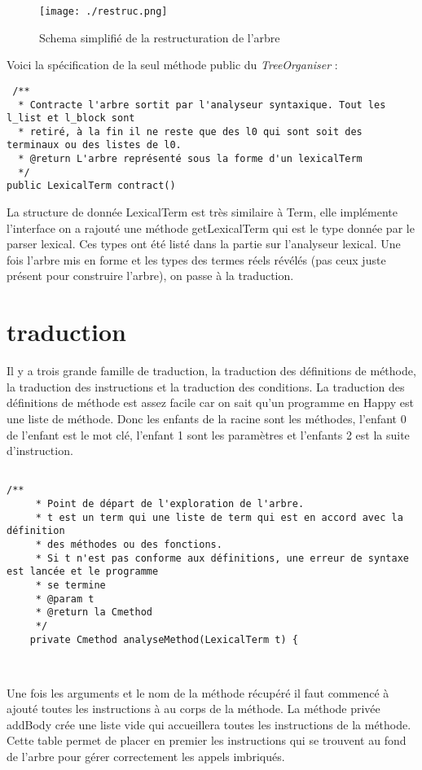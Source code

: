 \begin{figure}
 \centering
 \texttt{[image: ./restruc.png]}
 \caption{Schema simplifié de la restructuration de l'arbre}
 \label{restruc}
\end{figure}


Voici la spécification de la seul méthode public du \textit{TreeOrganiser} :
\begin{verbatim}
 /**
  * Contracte l'arbre sortit par l'analyseur syntaxique. Tout les l_list et l_block sont
  * retiré, à la fin il ne reste que des l0 qui sont soit des terminaux ou des listes de l0.
  * @return L'arbre représenté sous la forme d'un lexicalTerm
  */
public LexicalTerm contract()
\end{verbatim}

La structure de donnée LexicalTerm est très similaire à Term, elle implémente l'interface on a rajouté une méthode getLexicalTerm
qui est le type donnée par le parser lexical. Ces types ont été listé dans la partie sur l'analyseur lexical. Une fois 
l'arbre mis en forme et les types des termes réels révélés (pas ceux juste présent pour construire l'arbre), on passe à la traduction.

\section{traduction}
Il y a trois grande famille de traduction, la traduction des définitions de méthode, la traduction des instructions et la traduction des conditions.
La traduction des définitions de méthode est assez facile car on sait qu'un programme en Happy est une liste de méthode. Donc les enfants
de la racine sont les méthodes, l'enfant 0 de l'enfant est le mot clé, l'enfant 1 sont les paramètres et l'enfants 2 est la suite d'instruction.
\begin{verbatim}

/**
	 * Point de départ de l'exploration de l'arbre. 
	 * t est un term qui une liste de term qui est en accord avec la définition
	 * des méthodes ou des fonctions.
	 * Si t n'est pas conforme aux définitions, une erreur de syntaxe est lancée et le programme
	 * se termine
	 * @param t 
	 * @return la Cmethod 
	 */
	private Cmethod analyseMethod(LexicalTerm t) { 

 
\end{verbatim}

Une fois les arguments et le nom de la méthode récupéré il faut commencé à ajouté toutes les instructions à au corps de la méthode.
La méthode privée addBody crée une liste vide qui accueillera toutes les instructions de la méthode. Cette table permet de placer en premier
les instructions qui se trouvent au fond de l'arbre pour gérer correctement les appels imbriqués.

